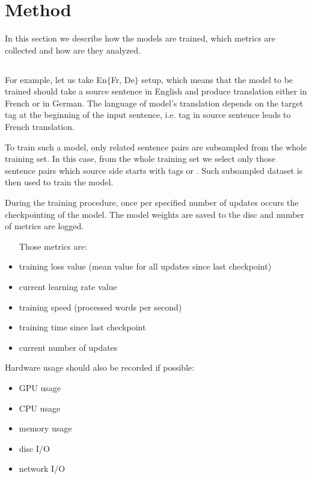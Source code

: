 \subsection{}
\label{subsection:en-to-5}

\cite{eisele-chen-2010-multiun}


\section{Method}
\label{section:method}

In this section we describe how the models are trained, which metrics
are collected and how are they analyzed.

\subsection{}

For example, let us take En\to{}$\{$Fr, De$\}$ setup, which means that
the model to be trained should take a source sentence in English and
produce translation either in French or in German.
The language of model's translation depends on the target tag at the beginning
of the input sentence, i.e.  tag in source sentence leads to French
translation.

To train such a model, only related sentence pairs are subsampled
from the whole training set.
In this case, from the whole training set we select only those sentence
pairs which source side starts with tags  or .
Such subsampled dataset is then used to train the model.

During the training procedure, once per specified number of updates
occurs the checkpointing of the model.
The model weights are saved to the disc and number of metrics are logged.

\begin{samepage}
\begin{itemize}
	\item [Those metrics are:]
	\item training loss value (mean value for all updates since
	last checkpoint)
	\item current learning rate value
	\item training speed (processed words per second)
	\item training time since last checkpoint
	\item current number of updates
\end{itemize}
\end{samepage}
\begin{samepage}
Hardware usage should also be recorded if possible:
\begin{itemize}
	\item GPU usage
	\item CPU usage
	\item memory usage
	\item disc I/O
	\item network I/O
\end{itemize}
\end{samepage}

